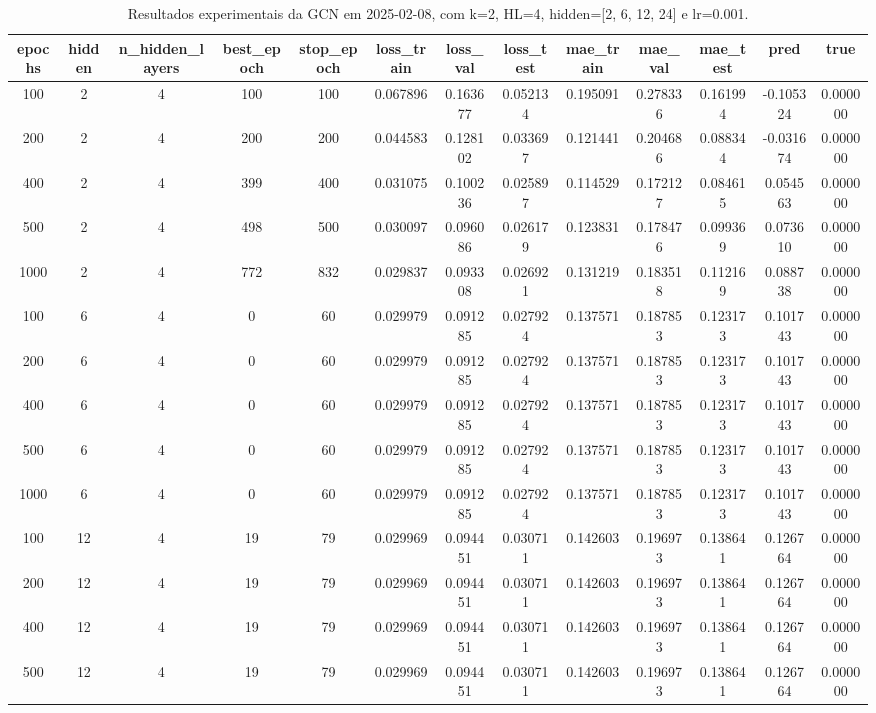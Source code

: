 \begin{table}[h]
\centering
\caption{Resultados experimentais da GCN em 2025-02-08, com k=2, HL=4, hidden=[2, 6, 12, 24] e lr=0.001.}
\label{tab:gcn_results_k2_hl4_d20250208}
\begin{tabular}{ccccccccccccc}
\toprule
epochs & hidden & n\_hidden\_layers & best\_epoch & stop\_epoch & loss\_train & loss\_val & loss\_test & mae\_train & mae\_val & mae\_test & pred & true \\
\midrule
100 & 2 & 4 & 100 & 100 & 0.067896 & 0.163677 & 0.052134 & 0.195091 & 0.278336 & 0.161994 & -0.105324 & 0.000000 \\
200 & 2 & 4 & 200 & 200 & 0.044583 & 0.128102 & 0.033697 & 0.121441 & 0.204686 & 0.088344 & -0.031674 & 0.000000 \\
400 & 2 & 4 & 399 & 400 & 0.031075 & 0.100236 & 0.025897 & 0.114529 & 0.172127 & 0.084615 & 0.054563 & 0.000000 \\
500 & 2 & 4 & 498 & 500 & 0.030097 & 0.096086 & 0.026179 & 0.123831 & 0.178476 & 0.099369 & 0.073610 & 0.000000 \\
1000 & 2 & 4 & 772 & 832 & 0.029837 & 0.093308 & 0.026921 & 0.131219 & 0.183518 & 0.112169 & 0.088738 & 0.000000 \\
100 & 6 & 4 & 0 & 60 & 0.029979 & 0.091285 & 0.027924 & 0.137571 & 0.187853 & 0.123173 & 0.101743 & 0.000000 \\
200 & 6 & 4 & 0 & 60 & 0.029979 & 0.091285 & 0.027924 & 0.137571 & 0.187853 & 0.123173 & 0.101743 & 0.000000 \\
400 & 6 & 4 & 0 & 60 & 0.029979 & 0.091285 & 0.027924 & 0.137571 & 0.187853 & 0.123173 & 0.101743 & 0.000000 \\
500 & 6 & 4 & 0 & 60 & 0.029979 & 0.091285 & 0.027924 & 0.137571 & 0.187853 & 0.123173 & 0.101743 & 0.000000 \\
1000 & 6 & 4 & 0 & 60 & 0.029979 & 0.091285 & 0.027924 & 0.137571 & 0.187853 & 0.123173 & 0.101743 & 0.000000 \\
100 & 12 & 4 & 19 & 79 & 0.029969 & 0.094451 & 0.030711 & 0.142603 & 0.196973 & 0.138641 & 0.126764 & 0.000000 \\
200 & 12 & 4 & 19 & 79 & 0.029969 & 0.094451 & 0.030711 & 0.142603 & 0.196973 & 0.138641 & 0.126764 & 0.000000 \\
400 & 12 & 4 & 19 & 79 & 0.029969 & 0.094451 & 0.030711 & 0.142603 & 0.196973 & 0.138641 & 0.126764 & 0.000000 \\
500 & 12 & 4 & 19 & 79 & 0.029969 & 0.094451 & 0.030711 & 0.142603 & 0.196973 & 0.138641 & 0.126764 & 0.000000 \\

\end{tabular}
\end{table}
